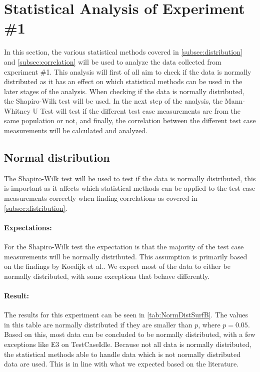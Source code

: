 \section{Statistical Analysis of Experiment \#1}\label{sec:Stat1}

In this section, the various statistical methods covered in \cref{subsec:distribution} and \cref{subsec:correlation} will be used to analyze the data collected from experiment \#1. This analysis will first of all aim to check if the data is normally distributed as it has an effect on which statistical methods can be used in the later stages of the analysis. When checking if the data is normally distributed, the Shapiro-Wilk test\cite{razali2011power} will be used. In the next step of the analysis, the Mann-Whitney U Test\cite{mann1947test} will test if the different test case measurements are from the same population or not, and finally, the correlation between the different test case measurements will be calculated and analyzed.

\subsection{Normal distribution}\label{subsec:NormalDist1}
The Shapiro-Wilk test will be used to test if the data is normally distributed, this is important as it affects which statistical methods can be applied to the test case measurements correctly when finding correlations as covered in \cref{subsec:distribution}. 

\paragraph{Expectations:} For the Shapiro-Wilk test the expectation is that the majority of the test case measurements will be normally distributed. This assumption is primarily based on the findings by Koedijk et al.\cite{Koedijk2022diff}. We expect most of the data to either be normally distributed, with some exceptions that behave differently.

\paragraph{Result:} The results for this experiment can be seen in \cref{tab:NormDistSurfB}. The values in this table are normally distributed if they are smaller than $p$, where $p = 0.05$\cite{wasserstein2019moving}. Based on this, most data can be concluded to be normally distributed, with a few exceptions like E3 on TestCaseIdle. Because not all data is normally distributed, the statistical methods able to handle data which is not normally distributed data are used. This is in line with what we expected based on the literature.

